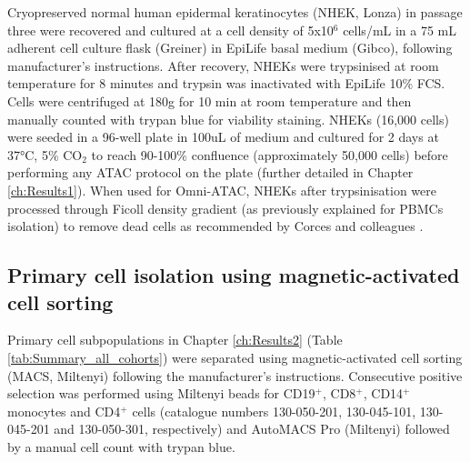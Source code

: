 Cryopreserved normal human epidermal keratinocytes (NHEK, Lonza) in passage three were recovered and cultured at a cell density of 5x10$^6$ cells/mL in a 75 mL adherent cell culture flask (Greiner) in EpiLife basal medium (Gibco), following manufacturer's instructions. After recovery, NHEKs were trypsinised at room temperature for 8 minutes and trypsin was inactivated with EpiLife 10\% FCS. Cells were centrifuged at 180g for 10 min at room temperature and then manually counted with trypan blue for viability staining. NHEKs (16,000 cells) were seeded in a 96-well plate in 100uL of medium and cultured for 2 days at 37°C, 5\% CO$_2$ to reach 90-100\% confluence (approximately 50,000 cells) before performing any ATAC protocol on the plate (further detailed in Chapter \ref{ch:Results1}). When used for Omni-ATAC, NHEKs after trypsinisation were processed through Ficoll density gradient (as previously explained for PBMCs isolation) to remove dead cells as recommended by Corces and colleagues \parencite{Corces2017}.


\subsection{Primary cell isolation using magnetic-activated cell sorting}
Primary cell subpopulations in Chapter \ref{ch:Results2} (Table \ref{tab:Summary_all_cohorts}) were separated using magnetic-activated cell sorting (MACS, Miltenyi) following the manufacturer's instructions. Consecutive positive selection was performed using Miltenyi beads for CD19$^+$, CD8$^+$, CD14$^+$ monocytes and CD4$^+$ cells (catalogue numbers 130-050-201, 130-045-101, 130-045-201 and 130-050-301, respectively) and AutoMACS Pro (Miltenyi) followed by a manual cell count with trypan blue. 


